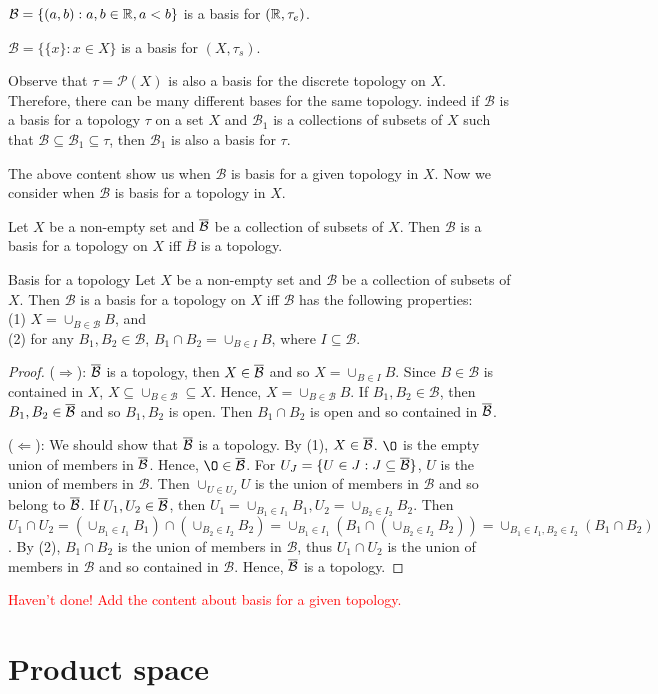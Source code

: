 \begin{example}{}{}
    $\mathcal{B}=\{(a,b):a,b\in\mathbb{R},a<b\}$ is a basis for $(\mathbb{R},\tau_e)$.
\end{example}

\begin{example}{}{}
    $\mathcal{B}=\{\{x\}:x\in X\}$ is a basis for $(X,\tau_s)$. 
\end{example}

Observe that $\tau=\mathcal{P}(X)$ is also a basis for the discrete topology on $X$. 
Therefore, there can be many different bases for the same topology. indeed if $\mathcal{B}$ is a basis for a topology $\tau$ on a set $X$ and $\mathcal{B}_1$ is a collections of subsets of $X$ such that $\mathcal{B}\subseteq \mathcal{B}_1\subseteq \tau$, then $\mathcal{B}_1$ is also a basis for $\tau$.


The above content show us when $\mathcal{B}$ is basis for a given topology in $X$. 
Now we consider when $\mathcal{B}$ is basis for a topology in $X$.

\begin{proposition}{}{}
    Let $X$ be a non-empty set and $\overline{\mathcal{B}}$ be a collection of subsets of $X$. Then $\mathcal{B}$ is a basis for a topology on $X$ iff
    $\overline{B}$ is a topology.
\end{proposition}


\begin{proposition}{Basis for a topology}{}
    Let $X$ be a non-empty set and $\mathcal{B}$ be a collection of subsets of $X$. Then $\mathcal{B}$ is a basis for a topology on $X$ iff $\mathcal{B}$ has the following properties:\\
    (1) $X=\cup_{B\in \mathcal{B}}B$, and\\
    (2) for any $B_1,B_2\in \mathcal{B}$, $B_1\cap B_2=\cup_{B\in I}B$, where $I\subseteq\mathcal{B}$.
\end{proposition}

\begin{proof}
($\Rightarrow$): $\overline{\mathcal{B}}$ is a topology, then $X\in \overline{\mathcal{B}}$ and so $X=\cup_{B\in I}B$.
Since $B\in\mathcal{B}$ is contained in $X$, $X\subseteq \cup_{B\in\mathcal{B}}\subseteq X$. Hence, $X=\cup_{B\in\mathcal{B}}B$.
If $B_1,B_2\in\mathcal{B}$, then $B_1,B_2\in\overline{\mathcal{B}}$ and so $B_1,B_2$ is open. Then $B_1\cap B_2$ is open and so contained in $\overline{\mathcal{B}}$. 

($\Leftarrow$): We should show that $\overline{\mathcal{B}}$ is a topology. By (1), $X\in\overline{\mathcal{B}}$. 
$\O$ is the empty union of members in $\overline{\mathcal{B}}$. Hence, $\O\in\ob$. For $U_J=\{U\in J: J\subseteq\overline{\mathcal{B}}\}$, $U$ is the union of members in $\mathcal{B}$.
Then $\cup_{U\in U_J} U$ is the union of members in $\mathcal{B}$ and so belong to $\overline{\mathcal{B}}$. 
If $U_1,U_2\in \overline{\mathcal{B}}$, then $U_1=\cup_{B_1\in I_1}B_1, U_2=\cup_{B_2\in I_2}B_2$.
Then $U_1\cap U_2 = (\cup_{B_1\in I_1}B_1)\cap (\cup_{B_2\in I_2}B_2)=\cup_{B_1\in I_1}(B_1\cap (\cup_{B_2\in I_2}B_2))= \cup_{B_1\in I_1,B_2\in I_2}(B_1\cap B_2)$. 
By (2), $B_1\cap B_2$ is the union of members in $\mathcal{B}$, thus $U_1\cap U_2$ is the union of members in $\mathcal{B}$ and so contained in $\mathcal{B}$.
Hence, $\overline{\mathcal{B}}$ is a topology.
\end{proof}

\textcolor{red}{Haven't done! Add the content about basis for a given topology.}

\section{Product space}
